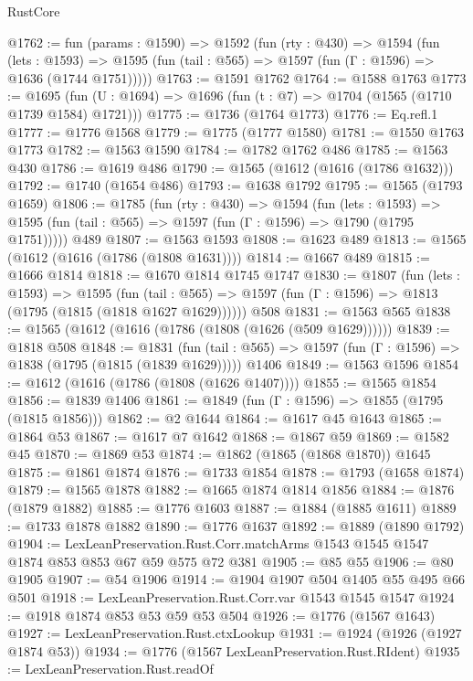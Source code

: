 \begin{lexlean}{RustCore}
\begin{coremodule}
@1762 := fun (params : @1590) =>
  @1592
    (fun (rty : @430) =>
    @1594
      (fun (lets : @1593) =>
      @1595 (fun (tail : @565) => @1597 (fun (Γ : @1596) => @1636 (@1744 @1751)))))
@1763 := @1591 @1762
@1764 := @1588 @1763
@1773 := @1695 (fun (U : @1694) => @1696 (fun (t : @7) => @1704 (@1565 (@1710 @1739 @1584) @1721)))
@1775 := @1736 (@1764 @1773)
@1776 := Eq.refl.{1}
@1777 := @1776 @1568
@1779 := @1775 (@1777 @1580)
@1781 := @1550 @1763 @1773
@1782 := @1563 @1590
@1784 := @1782 @1762 @486
@1785 := @1563 @430
@1786 := @1619 @486
@1790 := @1565 (@1612 (@1616 (@1786 @1632)))
@1792 := @1740 (@1654 @486)
@1793 := @1638 @1792
@1795 := @1565 (@1793 @1659)
@1806 := @1785
    (fun (rty : @430) =>
    @1594
      (fun (lets : @1593) =>
      @1595 (fun (tail : @565) => @1597 (fun (Γ : @1596) => @1790 (@1795 @1751)))))
    @489
@1807 := @1563 @1593
@1808 := @1623 @489
@1813 := @1565 (@1612 (@1616 (@1786 (@1808 @1631))))
@1814 := @1667 @489
@1815 := @1666 @1814
@1818 := @1670 @1814 @1745 @1747
@1830 := @1807
    (fun (lets : @1593) =>
    @1595
      (fun (tail : @565) => @1597 (fun (Γ : @1596) => @1813 (@1795 (@1815 (@1818 @1627 @1629))))))
    @508
@1831 := @1563 @565
@1838 := @1565 (@1612 (@1616 (@1786 (@1808 (@1626 (@509 @1629))))))
@1839 := @1818 @508
@1848 := @1831
    (fun (tail : @565) => @1597 (fun (Γ : @1596) => @1838 (@1795 (@1815 (@1839 @1629)))))
    @1406
@1849 := @1563 @1596
@1854 := @1612 (@1616 (@1786 (@1808 (@1626 @1407))))
@1855 := @1565 @1854
@1856 := @1839 @1406
@1861 := @1849 (fun (Γ : @1596) => @1855 (@1795 (@1815 @1856)))
@1862 := @2 @1644
@1864 := @1617 @45 @1643
@1865 := @1864 @53
@1867 := @1617 @7 @1642
@1868 := @1867 @59
@1869 := @1582 @45
@1870 := @1869 @53
@1874 := @1862 (@1865 (@1868 @1870)) @1645
@1875 := @1861 @1874
@1876 := @1733 @1854
@1878 := @1793 (@1658 @1874)
@1879 := @1565 @1878
@1882 := @1665 @1874 @1814 @1856
@1884 := @1876 (@1879 @1882)
@1885 := @1776 @1603
@1887 := @1884 (@1885 @1611)
@1889 := @1733 @1878 @1882
@1890 := @1776 @1637
@1892 := @1889 (@1890 @1792)
@1904 := LexLeanPreservation.Rust.Corr.matchArms
    @1543
    @1545
    @1547
    @1874
    @853
    @853
    @67
    @59
    @575
    @72
    @381
@1905 := @85 @55
@1906 := @80 @1905
@1907 := @54 @1906
@1914 := @1904 @1907 @504 @1405 @55 @495 @66 @501
@1918 := LexLeanPreservation.Rust.Corr.var @1543 @1545 @1547
@1924 := @1918 @1874 @853 @53 @59 @53 @504
@1926 := @1776 (@1567 @1643)
@1927 := LexLeanPreservation.Rust.ctxLookup
@1931 := @1924 (@1926 (@1927 @1874 @53))
@1934 := @1776 (@1567 LexLeanPreservation.Rust.RIdent)
@1935 := LexLeanPreservation.Rust.readOf

\end{coremodule}
\end{lexlean}
